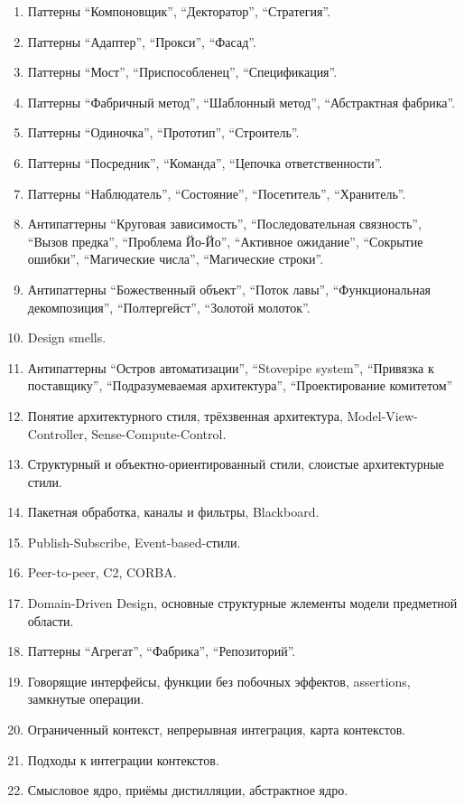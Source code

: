 \documentclass[a5paper]{article}
\begin{document}
\begin{enumerate}
	\item Паттерны ``Компоновщик'', ``Декторатор'', ``Стратегия''.
	\item Паттерны ``Адаптер'', ``Прокси'', ``Фасад''.
	\item Паттерны ``Мост'', ``Приспособленец'', ``Спецификация''.
	\item Паттерны ``Фабричный метод'', ``Шаблонный метод'', ``Абстрактная фабрика''.
	\item Паттерны ``Одиночка'', ``Прототип'', ``Строитель''.
	\item Паттерны ``Посредник'', ``Команда'', ``Цепочка ответственности''.
	\item Паттерны ``Наблюдатель'', ``Состояние'', ``Посетитель'', ``Хранитель''.
	\item Антипаттерны ``Круговая зависимость'', ``Последовательная связность'', ``Вызов предка'', ``Проблема Йо-Йо'', ``Активное ожидание'', ``Сокрытие ошибки'', ``Магические числа'', ``Магические строки''.
	\item Антипаттерны ``Божественный объект'', ``Поток лавы'', ``Функциональная декомпозиция'', ``Полтергейст'', ``Золотой молоток''.
	\item Design smells.
	\item Антипаттерны ``Остров автоматизации'', ``Stovepipe system'', ``Привязка к поставщику'', ``Подразумеваемая архитектура'', ``Проектирование комитетом''
	\item Понятие архитектурного стиля, трёхзвенная архитектура, Model-View-Controller, Sense-Compute-Control.
	\item Структурный и объектно-ориентированный стили, слоистые архитектурные стили.
	\item Пакетная обработка, каналы и фильтры, Blackboard.
	\item Publish-Subscribe, Event-based-стили.
	\item Peer-to-peer, C2, CORBA.
	\item Domain-Driven Design, основные структурные жлементы модели предметной области.
	\item Паттерны ``Агрегат'', ``Фабрика'', ``Репозиторий''.
	\item Говорящие интерфейсы, функции без побочных эффектов, assertions, замкнутые операции.
	\item Ограниченный контекст, непрерывная интеграция, карта контекстов.
	\item Подходы к интеграции контекстов.
	\item Смысловое ядро, приёмы дистилляции, абстрактное ядро.

\end{enumerate}
\end{document}
